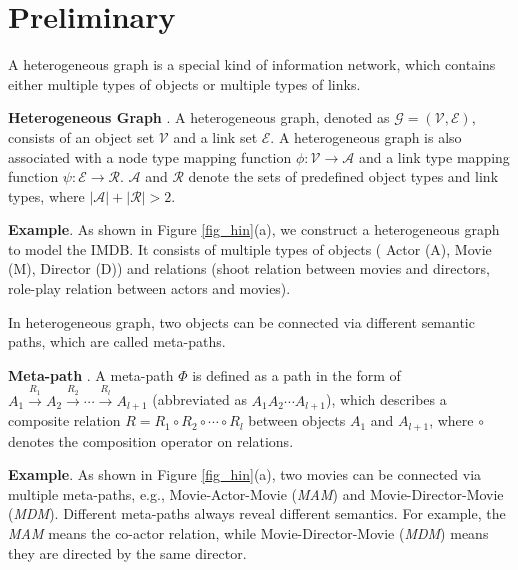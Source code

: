 \section{Preliminary}
A heterogeneous  graph is a special kind of information network, which contains either multiple types of objects or multiple types of links. 


\begin{definition}{\textbf{ Heterogeneous  Graph }\cite{sun2013mining}.}
	A  heterogeneous graph, denoted as $\mathcal{G}=(\mathcal{V},\mathcal{E})$, consists of an object set $\mathcal{V}$ and a link set $\mathcal{E}$.
A heterogeneous graph is also associated with a node type mapping function $\phi:\mathcal{V}\rightarrow \mathcal{A}$ and 
	a link type mapping function $\psi: \mathcal{E}\rightarrow \mathcal{R}$. $\mathcal{A}$ and $\mathcal{R}$ denote 
	the sets of predefined object types and link types, where $|\mathcal{A}|+|\mathcal{R}|>2$.
\end{definition}

\textbf{Example}. As shown in Figure \ref{fig_hin}(a), we construct a heterogeneous graph to model the IMDB. It consists of multiple types of objects ( Actor (A), Movie (M), Director (D))  and relations (shoot relation between movies and directors, role-play relation between actors and movies). 






In heterogeneous graph, two objects can be connected via different semantic paths, which are called meta-paths.
\begin{definition}{\textbf{Meta-path }\cite{sun2011pathsim}.}
A meta-path $\Phi$ is defined as a path in the form of $A_1 \xrightarrow{R_1} A_2 \xrightarrow{R_2} \cdots \xrightarrow{R_l} A_{l+1}$ (abbreviated as $A_1A_2 \cdots A_{l+1}$), which describes a composite relation $R = R_1 \circ R_2 \circ \cdots \circ R_l$ between objects $A_1$ and $A_{l+1}$, where $\circ$ denotes the composition operator on relations.
\end{definition}





\textbf{Example}. As shown in Figure \ref{fig_hin}(a), two movies can be connected via multiple meta-paths, e.g., Movie-Actor-Movie (\emph{MAM}) and Movie-Director-Movie (\emph{MDM}). Different meta-paths always reveal different semantics. For example, the \emph{MAM} means the co-actor relation, while Movie-Director-Movie (\emph{MDM}) means they are directed by the same director.



